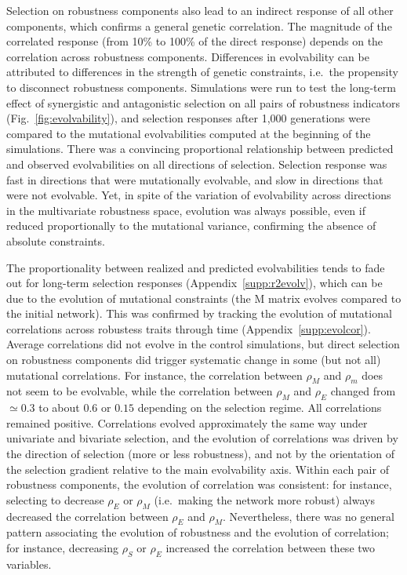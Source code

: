 \documentclass[10pt,a4paper]{article}
\newcommand{\stability}{{\rho_S}}
\newcommand{\earlyenv}{{\rho_E}}
\newcommand{\earlymut}{{\rho_M}}
\newcommand{\latemut}{{\rho_m}}
\newcommand{\M}{\bm{\mathrm M}}
\newcommand{\SupMat}{Appendix~}
\begin{document}
Selection on robustness components also lead to an indirect response of all other components, which confirms a general genetic correlation. The magnitude of the correlated response (from 10\% to 100\% of the direct response) depends on the correlation across robustness components. Differences in evolvability can be attributed to differences in the strength of genetic constraints, i.e.\ the propensity to disconnect robustness components. Simulations were run to test the long-term effect of synergistic and antagonistic selection on all pairs of robustness indicators (Fig.~\ref{fig:evolvability}), and selection responses after 1,000 generations were compared to the mutational evolvabilities computed at the beginning of the simulations. There was a convincing proportional relationship between predicted and observed evolvabilities on all directions of selection. Selection response was fast in directions that were mutationally evolvable, and slow in directions that were not evolvable. Yet, in spite of the variation of evolvability across directions in the multivariate robustness space, evolution was always possible, even if reduced proportionally to the mutational variance, confirming the absence of absolute constraints. 

The proportionality between realized and predicted evolvabilities tends to fade out for long-term selection responses (\SupMat \ref{supp:r2evolv}), which can be due to the evolution of mutational constraints (the $\M$ matrix evolves compared to the initial network). This was confirmed by tracking the evolution of mutational correlations across robustess traits through time (\SupMat \ref{supp:evolcor}). Average correlations did not evolve in the control simulations, but direct selection on robustness components did trigger systematic change in some (but not all) mutational correlations. For instance, the correlation between $\earlymut$ and $\latemut$ does not seem to be evolvable, while the correlation between $\earlymut$ and $\earlyenv$ changed from $\simeq 0.3$ to about $0.6$ or $0.15$ depending on the selection regime. All correlations remained positive. Correlations evolved approximately the same way under univariate and bivariate selection, and the evolution of correlations was driven by the direction of selection (more or less robustness), and not by the orientation of the selection gradient relative to the main evolvability axis. Within each pair of robustness components, the evolution of correlation was consistent: for instance, selecting to decrease $\earlyenv$ or $\earlymut$ (i.e.\ making the network more robust) always decreased the correlation between $\earlyenv$ and $\earlymut$. Nevertheless, there was no general pattern associating the evolution of robustness and the evolution of correlation; for instance, decreasing $\stability$ or $\earlyenv$ increased the correlation between these two variables. 
\end{document}
